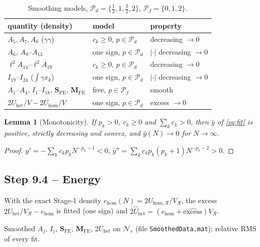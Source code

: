\documentclass[11pt,a4paper]{article}
\newcommand{\Nset}{\mathcal{N}}
\newcommand{\code}[1]{\texttt{#1}}
\theoremstyle{plain}
\newtheorem{lemma}{Lemma}
\theoremstyle{remark}
\begin{document}
\begin{table}[h]
\centering\small
\begin{tabular}{@{}lll@{}}
\toprule
quantity (density) & model & property\\
\midrule
$A_5,A_7,A_8$ ($\gamma\gamma$) & $c_k\ge0$, $p\in\mathcal P_d$ & decreasing $\to0$\\
$A_6$, $A_9$--$A_{13}$ & one sign, $p\in\mathcal P_d$ & $|\cdot|$ decreasing $\to0$\\
$\ell^2A_{14}$--$\ell^2A_{19}$ & $c_k\ge0$, $p\in\mathcal P_d$ & decreasing $\to0$\\
$I_{19}$--$I_{24}$ ($\int\gamma x_k$) & one sign, $p\in\mathcal P_d$ & $|\cdot|$ decreasing $\to0$\\
$A_1$--$A_4$, $I_1$--$I_{18}$, $\bm S_{\mathrm{FE}}$, $\bm M_{\mathrm{FE}}$ & free, $p\in\mathcal P_f$ & smooth\\
$2U_{\mathrm{het}}/V-2U_{\mathrm{hom}}/V$ & one sign, $p\in\mathcal P_d$ & excess $\to0$\\
\bottomrule
\end{tabular}
\caption{Smoothing models, $\mathcal P_d=\{\tfrac12,1,\tfrac32,2\}$, $\mathcal P_f=\{0,1,2\}$.}
\label{tab:smooth}
\end{table}

\begin{lemma}[Monotonicity]
If $p_k>0$, $c_k\ge0$ and $\sum_kc_k>0$, then $\hat y$ of \eqref{eq:fit} is positive, strictly
decreasing and convex, and $\hat y(N)\to0$ for $N\to\infty$.
\end{lemma}
\begin{proof}
$\hat y'=-\sum_kc_kp_kN^{-p_k-1}<0$, $\hat y''=\sum_kc_kp_k(p_k+1)N^{-p_k-2}>0$.
\end{proof}

\subsection*{Step 9.4 -- Energy}
With the exact Stage-1 density $e_{\mathrm{hom}}(N)=2U_{\mathrm{hom},\mathcal R}/V_{\mathcal R}$,
the excess $2U_{\mathrm{het}}/V_{\mathcal R}-e_{\mathrm{hom}}$ is fitted (one sign) and
$2\hat U_{\mathrm{het}}=(e_{\mathrm{hom}}+\widehat{\text{excess}})V_{\mathcal R}$.
\begin{delivers}
Smoothed $A_j$, $I_j$, $\bm S_{\mathrm{FE}}$, $\bm M_{\mathrm{FE}}$, $2U_{\mathrm{het}}$ on $\Nset_s$
(file \code{SmoothedData.mat}); relative RMS of every fit.
\end{delivers}

\end{document}
